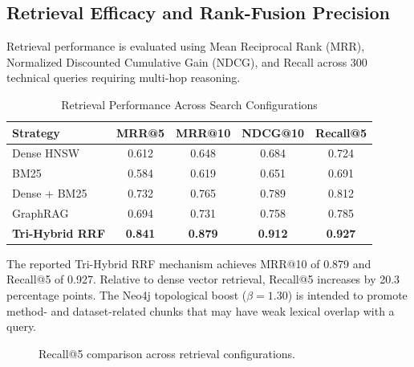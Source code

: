 \documentclass[conference]{IEEEtran}
\begin{document}
\subsection{Retrieval Efficacy and Rank-Fusion Precision}
Retrieval performance is evaluated using Mean Reciprocal Rank (MRR), Normalized Discounted Cumulative Gain (NDCG), and Recall across 300 technical queries requiring multi-hop reasoning.
\begin{table}[!t]
\caption{Retrieval Performance Across Search Configurations}
\label{tab:retrieval}
\centering
\footnotesize
\setlength{\tabcolsep}{3.5pt}
\begin{tabular}{@{}lcccc@{}}
\toprule
\textbf{Strategy} & \textbf{MRR@5} & \textbf{MRR@10} & \textbf{NDCG@10} & \textbf{Recall@5}\\
\midrule
Dense HNSW & 0.612 & 0.648 & 0.684 & 0.724\\
BM25 & 0.584 & 0.619 & 0.651 & 0.691\\
Dense + BM25 & 0.732 & 0.765 & 0.789 & 0.812\\
GraphRAG & 0.694 & 0.731 & 0.758 & 0.785\\
\textbf{Tri-Hybrid RRF} & \textbf{0.841} & \textbf{0.879} & \textbf{0.912} & \textbf{0.927}\\
\bottomrule
\end{tabular}
\end{table}
The reported Tri-Hybrid RRF mechanism achieves MRR@10 of 0.879 and Recall@5 of 0.927. Relative to dense vector retrieval, Recall@5 increases by 20.3 percentage points. The Neo4j topological boost ($\beta=1.30$) is intended to promote method- and dataset-related chunks that may have weak lexical overlap with a query.
\begin{figure}[!t]
\centering
{}
\caption{Recall@5 comparison across retrieval configurations.}
\label{fig:recall}
\end{figure}
\end{document}
